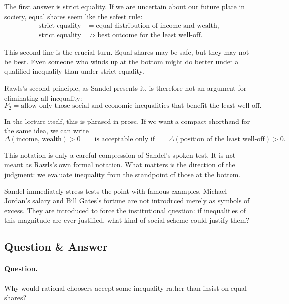 The first answer is strict equality. If we are uncertain about our future place in society, equal shares seem like the safest rule:
\begin{align}
\text{strict equality} &= \text{equal distribution of income and wealth},\\
\text{strict equality} &\not\Longrightarrow \text{best outcome for the least well-off}.
\end{align}

This second line is the crucial turn. Equal shares may be safe, but they may not be best. Even someone who winds up at the bottom might do better under a qualified inequality than under strict equality.

Rawls's second principle, as Sandel presents it, is therefore not an argument for eliminating all inequality:
\begin{equation}
P_2=\text{allow only those social and economic inequalities that benefit the least well-off}.
\end{equation}

In the lecture itself, this is phrased in prose. If we want a compact shorthand for the same idea, we can write
\begin{equation}
\Delta(\text{income, wealth})>0
\qquad\text{is acceptable only if}\qquad
\Delta(\text{position of the least well-off})>0.
\end{equation}

This notation is only a careful compression of Sandel's spoken test. It is not meant as Rawls's own formal notation. What matters is the direction of the judgment: we evaluate inequality from the standpoint of those at the bottom.

Sandel immediately stress-tests the point with famous examples. Michael Jordan's salary and Bill Gates's fortune are not introduced merely as symbols of excess. They are introduced to force the institutional question: if inequalities of this magnitude are ever justified, what kind of social scheme could justify them?

\subsection{Question \& Answer}

\paragraph{Question.} Why would rational choosers accept some inequality rather than insist on equal shares?

